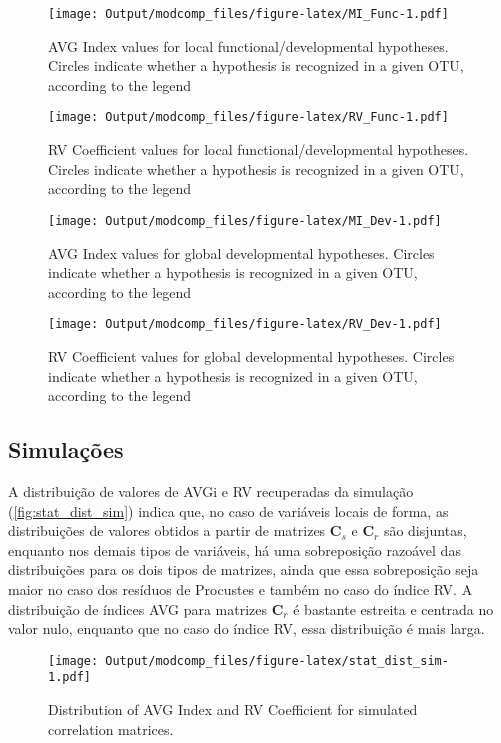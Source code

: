 \documentclass[11pt,]{article}
\begin{document}
\begin{figure}[htbp]
\centering
\texttt{[image: Output/modcomp\_files/figure-latex/MI\_Func-1.pdf]}
\caption{AVG Index values for local functional/developmental hypotheses.
Circles indicate whether a hypothesis is recognized in a given OTU,
according to the legend \label{fig:MI_Func}}
\end{figure}

\begin{figure}[htbp]
\centering
\texttt{[image: Output/modcomp\_files/figure-latex/RV\_Func-1.pdf]}
\caption{RV Coefficient values for local functional/developmental
hypotheses. Circles indicate whether a hypothesis is recognized in a
given OTU, according to the legend \label{fig:RV_Func}}
\end{figure}

\begin{figure}[htbp]
\centering
\texttt{[image: Output/modcomp\_files/figure-latex/MI\_Dev-1.pdf]}
\caption{AVG Index values for global developmental hypotheses. Circles
indicate whether a hypothesis is recognized in a given OTU, according to
the legend \label{fig:MI_Dev}}
\end{figure}

\begin{figure}[htbp]
\centering
\texttt{[image: Output/modcomp\_files/figure-latex/RV\_Dev-1.pdf]}
\caption{RV Coefficient values for global developmental hypotheses.
Circles indicate whether a hypothesis is recognized in a given OTU,
according to the legend \label{fig:RV_Dev}}
\end{figure}

\subsection{Simulações}\label{simulacoes-1}

A distribuição de valores de AVGi e RV recuperadas da simulação
(\autoref{fig:stat_dist_sim}) indica que, no caso de variáveis locais de
forma, as distribuições de valores obtidos a partir de matrizes
$\mathbf{C}_s$ e $\mathbf{C}_r$ são disjuntas, enquanto nos demais tipos
de variáveis, há uma sobreposição razoável das distribuições para os
dois tipos de matrizes, ainda que essa sobreposição seja maior no caso
dos resíduos de Procustes e também no caso do índice RV. A distribuição
de índices AVG para matrizes $\mathbf{C}_r$ é bastante estreita e
centrada no valor nulo, enquanto que no caso do índice RV, essa
distribuição é mais larga.

\begin{figure}[htbp]
\centering
\texttt{[image: Output/modcomp\_files/figure-latex/stat\_dist\_sim-1.pdf]}
\caption{Distribution of AVG Index and RV Coefficient for simulated
correlation matrices. \label{fig:stat_dist_sim}}
\end{figure}
\end{document}
